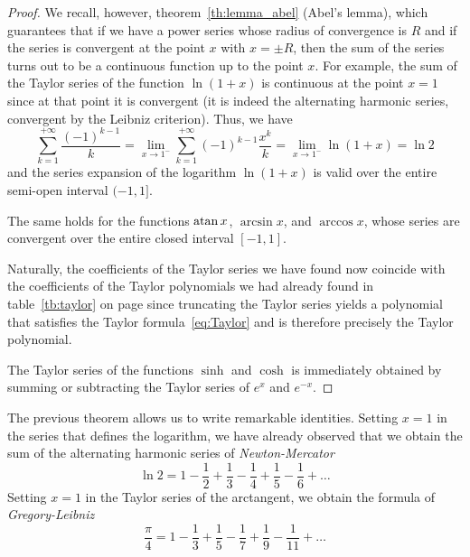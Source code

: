 \begin{proof}
    We recall, however, theorem~\ref{th:lemma_abel} (Abel's lemma), which
  guarantees that if we have a power series whose radius of convergence is $R$
  and if the series is convergent at the point $x$ with $x=\pm R$, then the sum
  of the series turns out to be a continuous function up to the point $x$. For
  example, the sum of the Taylor series of the function $\ln(1+x)$ is continuous
  at the point $x=1$ since at that point it is convergent (it is indeed the
  alternating harmonic series, convergent by the Leibniz criterion). Thus, we
  have
  \begin{equation}\label{eq:somma_serie_leibniz}
    \sum_{k=1}^{+\infty} \frac{(-1)^{k-1}} k 
    = \lim_{x\to 1^-} \sum_{k=1}^{+\infty} (-1)^{k-1} \frac{x^k}{k}
    = \lim_{x\to 1^-} \ln (1+x) = \ln 2 
  \end{equation}
    and the series expansion of the logarithm $\ln(1+x)$ is valid over the
  entire semi-open interval $(-1,1]$.

    The same holds for the functions $\operatorname{atan} x$, $\arcsin x$, and $\arccos x$,
  whose series are convergent over the entire closed interval $[-1,1]$.

    Naturally, the coefficients of the Taylor series we have found now coincide
  with the coefficients of the Taylor polynomials we had already found in
  table~\ref{tb:taylor} on page \pageref{tb:taylor} since truncating the Taylor
  series yields a polynomial that satisfies the Taylor formula~\eqref{eq:Taylor}
  and is therefore precisely the Taylor polynomial.

    The Taylor series of the functions $\sinh$ and $\cosh$ is immediately
  obtained by summing or subtracting the Taylor series of $e^x$ and $e^{-x}$.
\end{proof}

The previous theorem allows us to write remarkable identities. Setting $x=1$ in
the series that defines the logarithm, we have already observed that we obtain
the sum of the alternating harmonic series of \emph{Newton-Mercator}%
%
%
%
%
%
%
\begin{equation}\label{eq:serie_ln2}
  \ln 2 = 1 - \frac 1 2 + \frac 1 3 - \frac 1 4 + \frac 1 5 - \frac 1 6 + \dots
\end{equation}
Setting $x=1$ in the Taylor series of the arctangent, we obtain the formula of
\emph{Gregory-Leibniz}%
%
%
%
%
%
\[
  \frac \pi 4 =
   1 - \frac 1 3 + \frac 1 5 - \frac 1 7 + \frac 1 9 - \frac 1 {11} + \dots
\]

